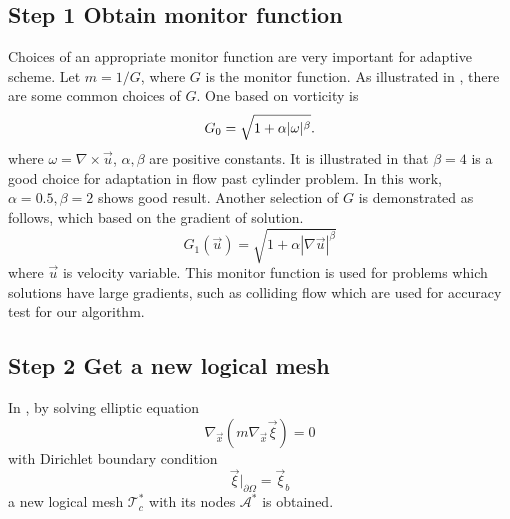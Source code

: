 \documentclass[a4paper, 11pt]{article}
\begin{document}
   \subsection{Step 1 Obtain monitor function}
      Choices of an appropriate monitor function are very important for
      adaptive scheme. Let $m = 1/G$, where $G$ is the monitor
      function. As illustrated in \cite{di2005moving}, there are some
      common choices of $G$. One based on vorticity is 
      \begin{equation}
        \centering
        G_0 = \sqrt{1 + \alpha |\omega|^\beta}.
        \label{eq::monitor_vorticity}
      \end{equation}
      where $\omega = \nabla \times \vec{u}$, $\alpha, \beta$
      are positive constants. It is illustrated in \cite{cao1999anr}
      that $\beta = 4$ is a good choice for adaptation in flow past
      cylinder problem. In this work, $\alpha = 0.5, \beta = 2$ shows
      good result. Another selection of $G$ is demonstrated as
      follows, which based on the gradient of solution.
      \begin{equation}
        G_1(\vec{u}) = \sqrt{1 + \alpha |\nabla \vec{u}|^\beta}
        \label{eq::monitor_gradient}
      \end{equation}
      where $\vec{u}$ is velocity variable. This monitor function is
      used for problems which solutions have large gradients, such as
      colliding flow which are used for accuracy test for our
      algorithm.
   \subsection{Step 2 Get a new logical mesh}
      In \cite{li2001mesh}, by solving elliptic equation 
      \begin{equation}
        \nabla_{\vec{x}}(m \nabla_{\vec{x}} \vec{\xi}) = 0
        \label{eq::logical}
      \end{equation}
      with Dirichlet boundary condition 
      \begin{equation}
        \vec{\xi}|_{\partial \Omega} = \vec{\xi}_b
        \label{eq::EL_boundary}
      \end{equation}
      a new logical mesh $\mathcal{T}_c^*$ with its nodes
      $\mathcal{A}^*$ is obtained.
\end{document}

